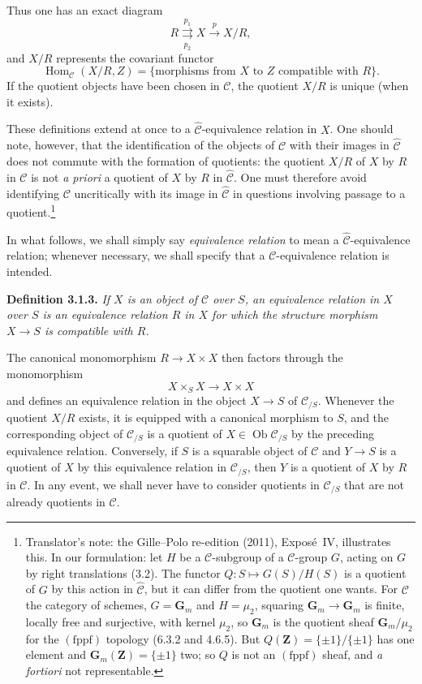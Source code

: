 Thus one has an exact diagram
\[
  R\overset{p_1}{\underset{p_2}{\rightrightarrows}}
  X\xrightarrow{p}X/R,
\]
and \(X/R\) represents the covariant functor
\[
  \operatorname{Hom}_{\mathscr C}(X/R,Z)
  =\{\text{morphisms from \(X\) to \(Z\) compatible with \(R\)}\}.
\]
If the quotient objects have been chosen in \(\mathscr C\), the quotient
\(X/R\) is unique (when it exists).

These definitions extend at once to a
\(\widehat{\mathscr C}\)-equivalence relation in \(X\). One should note,
however, that the identification of the objects of \(\mathscr C\) with their
images in \(\widehat{\mathscr C}\) does not commute with the formation of
quotients: the quotient \(X/R\) of \(X\) by \(R\) in \(\mathscr C\) is not
\emph{a priori} a quotient of \(X\) by \(R\) in
\(\widehat{\mathscr C}\). One must therefore avoid identifying
\(\mathscr C\) uncritically with its image in \(\widehat{\mathscr C}\) in
questions involving passage to a quotient.\footnote{Translator's note: the Gille--Polo re-edition (2011), Expos\'e~IV, illustrates
this. In our formulation: let \(H\) be a \(\mathscr C\)-subgroup of a
\(\mathscr C\)-group \(G\), acting on \(G\) by right translations (3.2). The
functor \(Q\colon S\mapsto G(S)/H(S)\) is a quotient of \(G\) by this action in
\(\widehat{\mathscr C}\), but it can differ from the quotient one wants. For
\(\mathscr C\) the category of schemes, \(G=\mathbf G_m\) and \(H=\mu_2\),
squaring \(\mathbf G_m\to\mathbf G_m\) is finite, locally free and
surjective, with kernel \(\mu_2\), so \(\mathbf G_m\) is the quotient sheaf
\(\mathbf G_m/\mu_2\) for the \((\mathrm{fppf})\) topology (6.3.2 and 4.6.5).
But \(Q(\mathbf Z)=\{\pm1\}/\{\pm1\}\) has one element and
\(\mathbf G_m(\mathbf Z)=\{\pm1\}\) two; so \(Q\) is not an
\((\mathrm{fppf})\) sheaf, and \emph{a fortiori} not representable.}

In what follows, we shall simply say \emph{equivalence relation} to mean a
\(\widehat{\mathscr C}\)-equivalence relation; whenever necessary, we shall
specify that a \(\mathscr C\)-equivalence relation is intended.

\medskip
\noindent{}\textbf{Definition 3.1.3.}
\textit{If \(X\) is an object of \(\mathscr C\) over \(S\), an
\emph{equivalence relation in \(X\) over \(S\)} is an equivalence relation
\(R\) in \(X\) for which the structure morphism \(X\to S\) is compatible
with \(R\).}

The canonical monomorphism \(R\to X\times X\) then factors through the
monomorphism
\[
  X\times_S X\longrightarrow X\times X
\]
and defines an equivalence relation in the object \(X\to S\) of
\(\mathscr C_{/S}\). Whenever the quotient \(X/R\) exists, it is equipped
with a canonical morphism to \(S\), and the corresponding object of
\(\mathscr C_{/S}\) is a quotient of \(X\in\operatorname{Ob}\mathscr C_{/S}\)
by the preceding equivalence relation. Conversely, if \(S\) is a squarable
object of \(\mathscr C\) and \(Y\to S\) is a quotient of \(X\) by this
equivalence relation in \(\mathscr C_{/S}\), then \(Y\) is a quotient of
\(X\) by \(R\) in \(\mathscr C\). In any event, we shall never have to
consider quotients in \(\mathscr C_{/S}\) that are not already quotients in
\(\mathscr C\).

